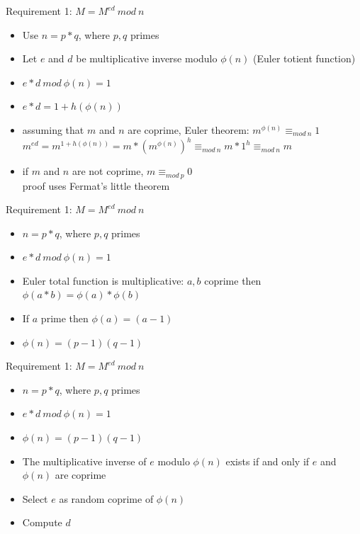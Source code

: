 \documentclass{beamer}
\begin{document}
\begin{frame}{Requirement 1: $M = M^{ed}\ mod\ n$}
  \begin{itemize}
    \item Use $n=p*q$, where $p,q$ primes 
    \item Let $e$ and $d$ be multiplicative inverse modulo $\phi(n)$ (Euler totient function)
    \item $e*d\ mod\ \phi(n) = 1$
    \item $e*d = 1 + h(\phi(n))$
    \item assuming that $m$ and $n$ are coprime, Euler theorem: $m^{\phi(n)} \equiv_{mod\ n} 1$\\
    $m^{ed} = m^{1 + h(\phi(n))} = m*(m^{\phi(n)})^h \equiv_{mod\ n} m * 1^h \equiv_{mod\ n} m$
    \item if $m$ and $n$ are not coprime, $m \equiv_{mod\ p} 0$\\
    proof uses Fermat's little theorem
  \end{itemize}
\end{frame}

\begin{frame}{Requirement 1: $M = M^{ed}\ mod\ n$}
  \begin{itemize}
    \item $n=p*q$, where $p,q$ primes 
    \item $e*d\ mod\ \phi(n) = 1$
    \item Euler total function is multiplicative: $a,b$ coprime then $\phi(a*b) = \phi(a)*\phi(b)$
    \item If $a$ prime then $\phi(a) = (a-1)$ 
    \item $\phi(n) = (p-1)(q-1)$
  \end{itemize}
\end{frame}

\begin{frame}{Requirement 1: $M = M^{ed}\ mod\ n$}
  \begin{itemize}
    \item $n=p*q$, where $p,q$ primes 
    \item $e*d\ mod\ \phi(n) = 1$
    \item $\phi(n) = (p-1)(q-1)$
    \item The multiplicative inverse of $e$ modulo $\phi(n)$ exists if and only if $e$ and $\phi(n)$ are coprime
    \item Select $e$ as random coprime of $\phi(n)$
    \item Compute $d$
  \end{itemize}
\end{frame}
\end{document}
